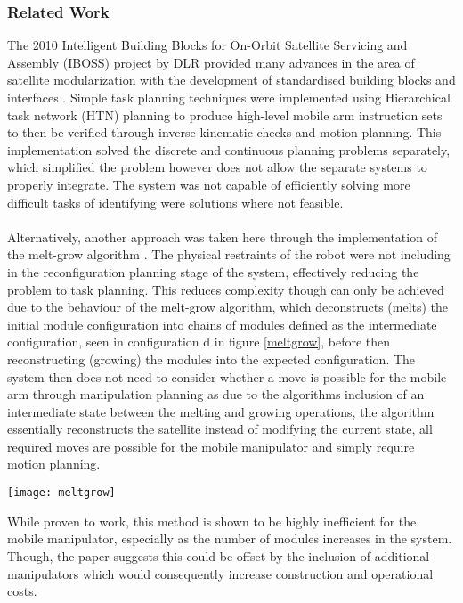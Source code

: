 \subsubsection{Related Work}
The 2010 Intelligent Building Blocks for On-Orbit Satellite Servicing and Assembly (IBOSS) project \cite{iBOSS} by DLR provided many advances in the area of satellite modularization with the development of standardised building blocks and interfaces \cite{iBossPaper}. Simple task planning techniques were implemented using Hierarchical task network (HTN) planning to produce high-level mobile arm instruction sets to then be verified through inverse kinematic checks and motion planning. This implementation solved the discrete and continuous planning problems separately, which simplified the problem however does not allow the separate systems to properly integrate. The system was not capable of efficiently solving more difficult tasks of identifying were solutions where not feasible.
\\\\
Alternatively, another approach was taken here \cite{8581406} through the implementation of the melt-grow algorithm \cite{773975}. The physical restraints of the robot were not including in the reconfiguration planning stage of the system, effectively reducing the problem to task planning. This reduces complexity though can only be achieved due to the behaviour of the melt-grow algorithm, which deconstructs (melts) the initial module configuration into chains of modules defined as the intermediate configuration, seen in configuration d in figure \ref{meltgrow}, before then reconstructing (growing) the modules into the expected configuration. The system then does not need to consider whether a move is possible for the mobile arm through manipulation planning as due to the algorithms inclusion of an intermediate state between the melting and growing operations, the algorithm essentially reconstructs the satellite instead of modifying the current state, all required moves are possible for the mobile manipulator and simply require motion planning.
\begin{figure*}[!t]
	\centering
	\texttt{[image: meltgrow]}
	\caption{Melt-Grow algorithm simulation results. Image from \cite{8581406}}
	\label{meltgrow}
\end{figure*}
While proven to work, this method is shown to be highly inefficient for the mobile manipulator, especially as the number of modules increases in the system. Though, the paper \cite{8581406} suggests this could be offset by the inclusion of additional manipulators which would consequently increase construction and operational costs.
